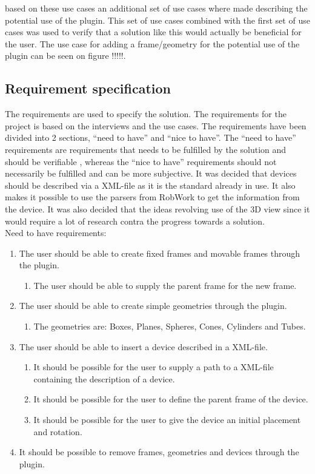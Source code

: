 based on these use cases an additional set of use cases where made describing the potential use of the plugin. This set of use cases combined with the first set of use cases was used to verify that a solution like this would actually be beneficial for the user. The use case for adding a frame/geometry for the potential use of the plugin can be seen on figure !!!!!.

\subsection{Requirement specification}
The requirements are used to specify the solution. The requirements for the project is based on the interviews and the use cases. The requirements have been divided into 2 sections, “need to have” and “nice to have”. The “need to have” requirements are requirements that needs to be fulfilled by the solution and should be verifiable , whereas the “nice to have” requirements should not necessarily be fulfilled and can be more subjective. It was decided that devices should be described via a XML-file as it is the standard already in use. It also makes it possible to use the parsers from RobWork to get the information from the device. It was also decided that the ideas revolving use of the 3D view since it would require a lot of research contra the progress towards a solution.\\

Need to have requirements:
\begin{enumerate}
	\item The user should be able to create fixed frames and movable frames through the plugin.
	\begin{enumerate}
		\item The user should be able to supply the parent frame for the new frame.
	\end{enumerate}
	\item The user should be able to create simple geometries through the plugin.
	\begin{enumerate}
		\item The geometries are: Boxes, Planes, Spheres, Cones, Cylinders and Tubes.
	\end{enumerate}
	\item The user should be able to insert a device described in a XML-file.
	\begin{enumerate}
		\item It should be possible for the user to supply a path to a XML-file containing the description of a device.
		\item It should be possible for the user to define the parent frame of the device.
		\item It should be possible for the user to give the device an initial placement and rotation.
	\end{enumerate}
	\item It should be possible to remove frames, geometries and devices through the plugin.
\end{enumerate}

